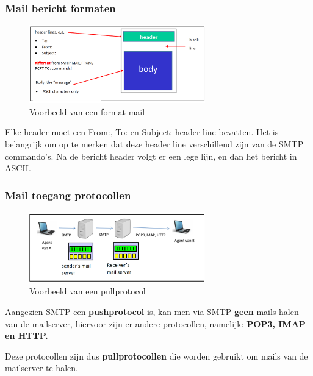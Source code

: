 \newpage

\subsubsection{Mail bericht formaten}

\begin{figure}[h]
\centering
\includegraphics[width=3in]{./img/imghfdst2/formatmail.PNG}
\caption{Voorbeeld van een format mail }
\label{fig:format mail}
\end{figure}

\noindent Elke header moet een From:, To: en Subject: header line bevatten. Het is belangrijk om op te merken dat deze header line verschillend zijn van de SMTP commando’s. Na de bericht header volgt er een lege lijn, en dan het bericht in ASCII.

\subsubsection{Mail toegang protocollen}

\begin{figure}[h]
\centering
\includegraphics[width=3in]{./img/imghfdst2/access.PNG}
\caption{Voorbeeld van een pullprotocol }
\label{fig:pullprotocol}
\end{figure}

\noindent Aangezien SMTP een \textbf{pushprotocol} is, kan men via SMTP \textbf{geen} mails halen van de mailserver, hiervoor zijn er andere protocollen, namelijk: \textbf{POP3, IMAP en HTTP.}

\noindent Deze protocollen zijn dus \textbf{pullprotocollen} die worden gebruikt om mails van de mailserver te halen.

%


